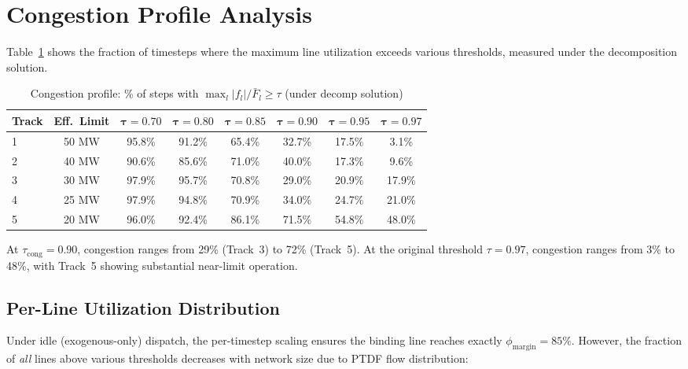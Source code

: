 \documentclass[11pt,a4paper]{article}
\begin{document}
\section{Congestion Profile Analysis}

Table~\ref{tab:cong-profile} shows the fraction of timesteps where the maximum line utilization exceeds various thresholds, measured under the decomposition solution.

\begin{table}[h]
\centering
\caption{Congestion profile: \% of steps with $\max_l |f_l|/\bar{F}_l \geq \tau$ (under decomp solution)}
\label{tab:cong-profile}
\begin{tabular}{lccccccc}
\toprule
\textbf{Track} & \textbf{Eff.\ Limit} & $\boldsymbol{\tau=0.70}$ & $\boldsymbol{\tau=0.80}$ & $\boldsymbol{\tau=0.85}$ & $\boldsymbol{\tau=0.90}$ & $\boldsymbol{\tau=0.95}$ & $\boldsymbol{\tau=0.97}$ \\
\midrule
1 & 50 MW & 95.8\% & 91.2\% & 65.4\% & 32.7\% & 17.5\% & 3.1\% \\
2 & 40 MW & 90.6\% & 85.6\% & 71.0\% & 40.0\% & 17.3\% & 9.6\% \\
3 & 30 MW & 97.9\% & 95.7\% & 70.8\% & 29.0\% & 20.9\% & 17.9\% \\
4 & 25 MW & 97.9\% & 94.8\% & 70.9\% & 34.0\% & 24.7\% & 21.0\% \\
5 & 20 MW & 96.0\% & 92.4\% & 86.1\% & 71.5\% & 54.8\% & 48.0\% \\
\bottomrule
\end{tabular}
\end{table}

At $\tau_{\mathrm{cong}} = 0.90$, congestion ranges from 29\% (Track~3) to 72\% (Track~5). At the original threshold $\tau = 0.97$, congestion ranges from 3\% to 48\%, with Track~5 showing substantial near-limit operation.

\subsection{Per-Line Utilization Distribution}

Under idle (exogenous-only) dispatch, the per-timestep scaling ensures the binding line reaches exactly $\phi_{\mathrm{margin}} = 85\%$. However, the fraction of \emph{all} lines above various thresholds decreases with network size due to PTDF flow distribution:
\end{document}
